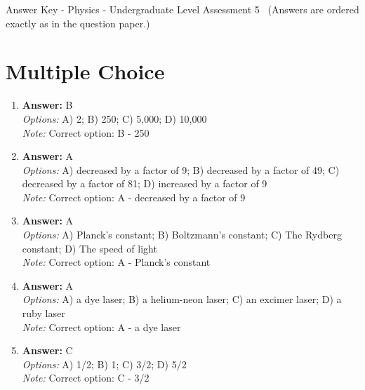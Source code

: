 \documentclass[12pt]{article}
\begin{document}
\begin{center}
Answer Key - Physics - Undergraduate Level Assessment 5 \
\small (Answers are ordered exactly as in the question paper.)
\end{center}

\section*{Multiple Choice}
\begin{enumerate}[label=\arabic*.]
\item \textbf{Answer:} B
\\ \textit{Options:} A) 2; B) 250; C) 5,000; D) 10,000
\\ \textit{Note:} Correct option: B - 250
\item \textbf{Answer:} A
\\ \textit{Options:} A) decreased by a factor of 9; B) decreased by a factor of 49; C) decreased by a factor of 81; D) increased by a factor of 9
\\ \textit{Note:} Correct option: A - decreased by a factor of 9
\item \textbf{Answer:} A
\\ \textit{Options:} A) Planck's constant; B) Boltzmann's constant; C) The Rydberg constant; D) The speed of light
\\ \textit{Note:} Correct option: A - Planck's constant
\item \textbf{Answer:} A
\\ \textit{Options:} A) a dye laser; B) a helium-neon laser; C) an excimer laser; D) a ruby laser
\\ \textit{Note:} Correct option: A - a dye laser
\item \textbf{Answer:} C
\\ \textit{Options:} A) 1/2; B) 1; C) 3/2; D) 5/2
\\ \textit{Note:} Correct option: C - 3/2
\end{enumerate}
\end{document}
